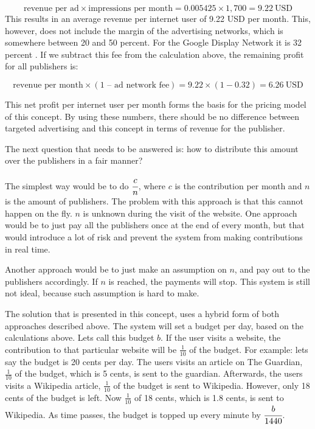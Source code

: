 \begin{equation}
  \text{revenue per ad} \times \text{impressions per month} = 0.005425 \times 1,700 = 9.22 ~\text{USD}
\end{equation}
This results in an average revenue per internet user of 9.22 USD per month. This, however, does not include the margin of the advertising networks, which is somewhere between 20 and 50 percent. For the Google Display Network it is 32 percent \cite{googlefee}. If we subtract this fee from the calculation above, the remaining profit for all publishers is:


\begin{equation}
  \text{revenue per month} \times (\text{1 -- ad network fee}) = 9.22 \times (1 - 0.32) = 6.26 ~\text{USD}
\end{equation}


This net profit per internet user per month forms the basis for the pricing model of this concept. By using these numbers, there should be no difference between targeted advertising and this concept in terms of revenue for the publisher.

The next question that needs to be answered is: how to distribute this amount over the publishers in a fair manner?  

The simplest way would be to do $\cfrac{c}{n}$, where $c$ is the contribution per month and $n$ is the amount of publishers. The problem with this approach is that this cannot happen on the fly. $n$ is unknown during the visit of the website. One approach would be to just pay all the publishers once at the end of every month, but that would introduce a lot of risk and prevent the system from making contributions in real time. 

Another approach would be to just make an assumption on $n$, and pay out to the publishers accordingly. If $n$ is reached, the payments will stop. This system is still not ideal, because such assumption is hard to make.

The solution that is presented in this concept, uses a hybrid form of both approaches described above. The system will set a budget per day, based on the calculations above. Lets call this budget $b$. If the user visits a website, the contribution to that particular website will be $\frac{1}{10}$ of the budget. For example: lets say the budget is 20 cents per day. The users visits an article on The Guardian, $\frac{1}{10}$ of the budget, which is 5 cents, is sent to the guardian. Afterwards, the users visits a Wikipedia article, $\frac{1}{10}$ of the budget is sent to Wikipedia. However, only 18 cents of the budget is left. Now $\frac{1}{10}$ of 18 cents, which is 1.8 cents, is sent to Wikipedia. As time passes, the budget is topped up every minute by $\cfrac{b}{1440}$.

